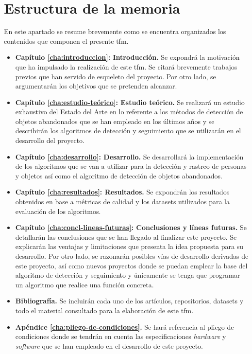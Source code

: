 \section{Estructura de la memoria}
\label{sec:estructura-memoria}
En este apartado se resume brevemente como se encuentra organizados los contenidos que componen el presente \gls{tfm}.

\begin{itemize}
    \item \textbf{Capítulo \ref{cha:introduccion}: Introducción.} Se expondrá la motivación que ha impulsado la realización de este \gls{tfm}. Se citará brevemente trabajos previos que han servido de esqueleto del proyecto. Por otro lado, se argumentarán los objetivos que se pretenden alcanzar.
    \item \textbf{Capítulo \ref{cha:estudio-teórico}: Estudio teórico.} Se realizará un estudio exhaustivo del Estado del Arte en lo referente a los métodos de detección de objetos abandonados que se han empleado en los últimos años y se describirán los algoritmos de detección y seguimiento que se utilizarán en el desarrollo del proyecto.
    \item \textbf{Capítulo \ref{cha:desarrollo}: Desarrollo.} Se desarrollará la implementación de los algoritmos que se van a utilizar para la detección y rastreo de personas y objetos así como el algoritmo de detección de objetos abandonados.
    \item \textbf{Capítulo \ref{cha:resultados}: Resultados.} Se expondrán los resultados obtenidos en base a métricas de calidad y los datasets utilizados para la evaluación de los algoritmos.
    \item \textbf{Capítulo \ref{cha:concl-lineas-futuras}: Conclusiones y líneas futuras.} Se detallarán las conclusiones que se han llegado al finalizar este proyecto. Se explicarán las ventajas y limitaciones que presenta la idea propuesta para su desarrollo. Por otro lado, se razonarán posibles vías de desarrollo derivadas de este proyecto, así como nuevos proyectos donde se puedan emplear la base del algoritmo de detección y seguimiento y únicamente se tenga que programar un algoritmo que realice una función concreta.
    \item \textbf{Bibliografía.} Se incluirán cada uno de los artículos, repositorios, datasets y todo el material consultado para la elaboración de este \gls{tfm}. 
    \item \textbf{Apéndice \ref{cha:pliego-de-condiciones}.} Se hará referencia al pliego de condiciones donde se tendrán en cuenta las especificaciones \textit{hardware} y \textit{software} que se han empleado en el desarrollo de este proyecto.

\end{itemize}
